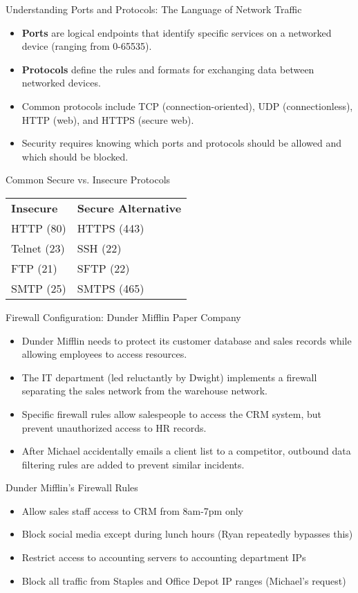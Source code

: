 \documentclass{beamer}
\begin{document}
\begin{frame}{Understanding Ports and Protocols: The Language of Network Traffic}
\begin{itemize}
\item \textbf{Ports} are logical endpoints that identify specific services on a networked device (ranging from 0-65535).
\item \textbf{Protocols} define the rules and formats for exchanging data between networked devices.
\item Common protocols include TCP (connection-oriented), UDP (connectionless), HTTP (web), and HTTPS (secure web).
\item Security requires knowing which ports and protocols should be allowed and which should be blocked.
\end{itemize}

\begin{exampleblock}{Common Secure vs. Insecure Protocols}
\begin{tabular}{ll}
\textbf{Insecure} & \textbf{Secure Alternative} \\
HTTP (80) & HTTPS (443) \\
Telnet (23) & SSH (22) \\
FTP (21) & SFTP (22) \\
SMTP (25) & SMTPS (465) \\
\end{tabular}
\end{exampleblock}
\end{frame}

\begin{frame}{Firewall Configuration: Dunder Mifflin Paper Company}
\begin{itemize}
\item Dunder Mifflin needs to protect its customer database and sales records while allowing employees to access resources.
\item The IT department (led reluctantly by Dwight) implements a firewall separating the sales network from the warehouse network.
\item Specific firewall rules allow salespeople to access the CRM system, but prevent unauthorized access to HR records.
\item After Michael accidentally emails a client list to a competitor, outbound data filtering rules are added to prevent similar incidents.
\end{itemize}

\begin{alertblock}{Dunder Mifflin's Firewall Rules}
\begin{itemize}
\item Allow sales staff access to CRM from 8am-7pm only
\item Block social media except during lunch hours (Ryan repeatedly bypasses this)
\item Restrict access to accounting servers to accounting department IPs
\item Block all traffic from Staples and Office Depot IP ranges (Michael's request)
\end{itemize}
\end{alertblock}
\end{frame}
\end{document}
